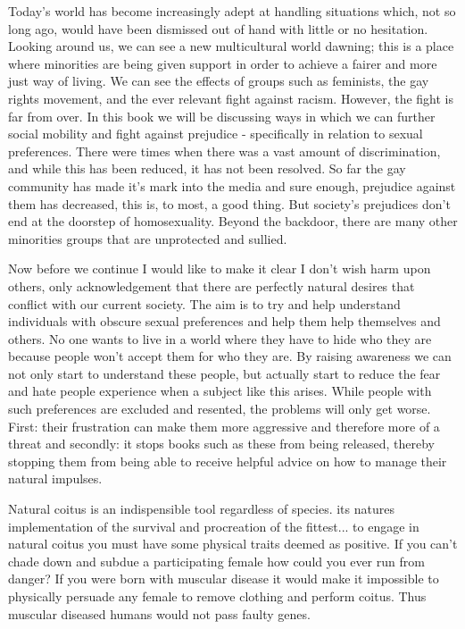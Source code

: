 Today's world has become increasingly adept at handling situations which, not so 
long ago, would have been dismissed out of hand with little or no hesitation. 
Looking around us, we can see a new multicultural world dawning; this is a place 
where minorities are being given support in order to achieve a fairer and more 
just way of living. We can see the effects of groups such as feminists, the gay 
rights movement, and the ever relevant fight against  racism. However, the fight 
is far from over. In this book we will be discussing ways in which we can 
further social mobility and fight against prejudice - specifically in relation 
to sexual preferences. There were times when there was a vast amount of 
discrimination, and while this has been reduced, it has not been resolved. So 
far the gay community has made it’s mark into the media and sure enough, 
prejudice against them has decreased, this is, to most, a good thing. But 
society's prejudices don't end at the doorstep of homosexuality. Beyond the 
backdoor, there are many other minorities groups that are unprotected and 
sullied.

Now before we continue I would like to make it clear I don't wish harm upon 
others, only acknowledgement that there are perfectly natural desires that 
conflict with our current society. The aim is to try and help understand 
individuals with obscure sexual preferences and help them help themselves and 
others. No one wants to live in a world where they have to hide who they are 
because people won't accept them for who they are. By raising awareness we can 
not only start to understand these people, but actually start to reduce the fear 
and hate people experience when a subject like this arises. While people with 
such preferences are excluded and resented, the problems will only get worse. 
First: their frustration can make them more aggressive and therefore more of a 
threat and secondly: it stops books such as these from being released, thereby 
stopping them from being able to receive helpful advice on how to manage their 
natural impulses.


Natural coitus is an indispensible tool regardless of species. its natures 
implementation of the survival and procreation of the fittest... to engage in 
natural coitus you must have some physical traits deemed as positive. If you 
can't chade down and subdue a participating female how could you ever run from 
danger? If you were born with muscular disease it would make it impossible to 
physically persuade any female to remove clothing and perform coitus. Thus 
muscular diseased humans would not pass faulty genes.


